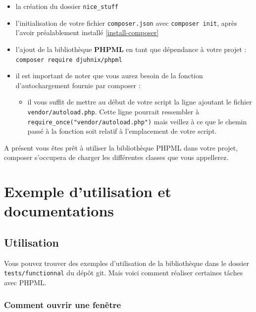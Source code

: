 \documentclass[11pt,a4paper,krantz2,11pt,oneside]{krantz}
\providecommand{\tightlist}{%
  \setlength{\itemsep}{0pt}\setlength{\parskip}{0pt}}
\begin{document}
\begin{itemize}
\tightlist
\item
  la création du dossier \texttt{nice\_stuff}
\item
  l'initialisation de votre fichier \texttt{composer.json} avec \texttt{composer\ init}, après l'avoir préalablement installé \ref{install-composer}
\item
  l'ajout de la bibliothèque \textbf{PHPML} en tant que dépendance à votre projet : \texttt{composer\ require\ djuhnix/phpml}
\item
  il est important de noter que vous aurez besoin de la fonction d'autochargement fournie par composer :

  \begin{itemize}
  \tightlist
  \item
    il vous suffit de mettre au début de votre script la ligne ajoutant le fichier \texttt{vendor/autoload.php}. Cette ligne pourrait ressembler à \texttt{require\_once("vendor/autoload.php")} mais veillez à ce que le chemin passé à la fonction soit relatif à l'emplacement de votre script.
  \end{itemize}
\end{itemize}

A présent vous êtes prêt à utiliser la bibliothèque PHPML dans votre projet, composer s'occupera de charger les différentes classes que vous appellerez.

\hypertarget{exemple-dutilisation-et-documentations}{%
\section{Exemple d'utilisation et documentations}\label{exemple-dutilisation-et-documentations}}

\hypertarget{utilisation}{%
\subsection{Utilisation}\label{utilisation}}

Vous pouvez trouver des exemples d'utilisation de la bibliothèque dans le dossier \texttt{tests/functionnal} du dépôt git. Mais voici comment réaliser certaines tâches avec PHPML.

\hypertarget{comment-ouvrir-une-fenuxeatre}{%
\subsubsection{Comment ouvrir une fenêtre}\label{comment-ouvrir-une-fenuxeatre}}
\end{document}
